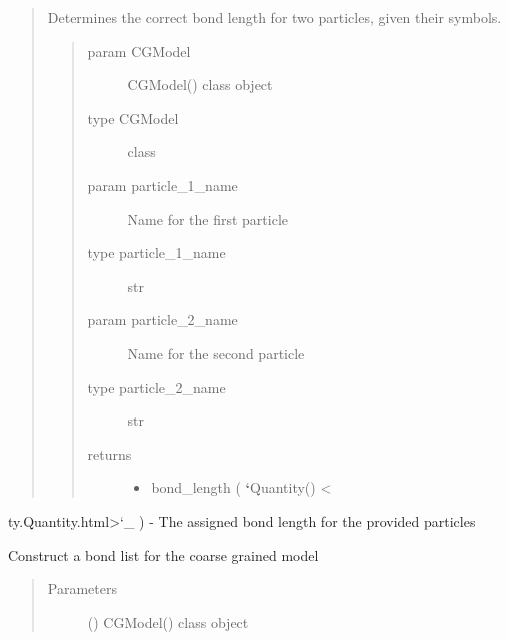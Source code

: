 \documentclass[letterpaper,12pt,english,openany,oneside]{sphinxmanual}
\begin{document}
\begin{fulllineitems}
\begin{fulllineitems}
\begin{quote}
Determines the correct bond length for two particles, given their symbols.
\begin{quote}\begin{description}
\item[{param CGModel}] \leavevmode
CGModel() class object

\item[{type CGModel}] \leavevmode
class

\item[{param particle\_1\_name}] \leavevmode
Name for the first particle

\item[{type particle\_1\_name}] \leavevmode
str

\item[{param particle\_2\_name}] \leavevmode
Name for the second particle

\item[{type particle\_2\_name}] \leavevmode
str

\item[{returns}] \leavevmode\begin{itemize}
\item {} 
bond\_length ( {\color{red}\bfseries{}{}`}Quantity() \textless{}

\end{itemize}

\end{description}\end{quote}
\end{quote}

ty.Quantity.html\textgreater{}{}`\_ ) - The assigned bond length for the provided particles

\end{fulllineitems}


\begin{fulllineitems}
\label{\detokenize{cg_model:cg_model.cgmodel.CGModel.get_bond_list}}
Construct a bond list for the coarse grained model
\begin{quote}\begin{description}
\item[{Parameters}] \leavevmode
{} () \textendash{} CGModel() class object


\end{description}
\end{quote}
\end{fulllineitems}
\end{fulllineitems}
\end{document}

